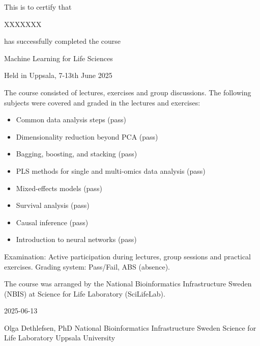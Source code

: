 \documentclass[12pt]{article}\usepackage[]{graphicx}\usepackage[]{color}
\newcommand{\courseName}{Machine Learning for Life Sciences}
\newcommand{\courseLocation}{in Uppsala}
\newcommand{\courseDate}{7-13th June 2025}
\newcommand{\courseLastDay}{2025-06-13}
\newcommand{\courseExaminer}{Olga Dethlefsen, PhD}
\begin{document}
\large
This is to certify that 


\LARGE
XXXXXXX

\large
has successfully completed the course \newline

\LARGE
\begin{center}{\courseName}  \end{center} 


\large
\begin{center} Held  {\courseLocation}, {\courseDate} \end{center} 

\vspace{5mm}
\normalsize
The course consisted of lectures, exercises and group discussions. The following subjects were covered and graded in the lectures and exercises:
\begin{itemize}
\item Common data analysis steps (pass)
\item Dimensionality reduction beyond PCA (pass)
\item Bagging, boosting, and stacking (pass)
\item PLS methods for single and multi-omics data analysis (pass)
\item Mixed-effects models (pass)
\item Survival analysis (pass)
\item Causal inference (pass)
\item Introduction to neural networks (pass)
\end{itemize}


\vspace{5mm}
Examination: \newline
Active participation during lectures, group sessions and practical exercises. Grading system: Pass/Fail, ABS (absence). 

\vspace{8mm}
The course was arranged by the National Bioinformatics Infrastructure Sweden (NBIS) at Science for Life Laboratory (SciLifeLab).


\vspace{8mm}
 {\courseLastDay}
\vspace{22mm}


{\courseExaminer} \newline
\small
National Bioinformatics Infrastructure Sweden \newline
Science for Life Laboratory \newline
Uppsala University \newline
\end{document}

